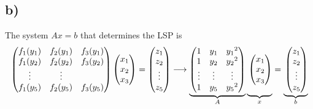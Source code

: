 \documentclass[12pt]{article}
\theoremstyle{definition}
\theoremstyle{definition}
\theoremstyle{definition}
\theoremstyle{definition}
\theoremstyle{definition}
\theoremstyle{example}
\theoremstyle{note}
\theoremstyle{remark}
\theoremstyle{example}
\begin{document}
			\subsection*{b) }	
				The system $Ax = b$ that determines the LSP is
				$$\begin{pmatrix}
				f_{1} (y_{1})  &f_{2} (y_{1})  & f_{3} (y_{1}) \\
				f_{1} (y_{2})  &f_{2} (y_{2}) & f_{3} (y_{2}) \\
				\vdots & \vdots \\
				f_{1} (y_{5})  &f_{2} (y_{5})  & f_{3} (y_{5})
				\end{pmatrix}
				\begin{pmatrix}
				x_{1} \\ x_{2} \\x_{3}
				\end{pmatrix}
				=\begin{pmatrix}
				z_{1} \\ z_{2}\\ \vdots\\ z_{5}
				\end{pmatrix}
				\longrightarrow
				\underbrace{\begin{pmatrix}
						1 & y_{1} & {y_{1}}^{2} \\
						1 & y_{2} & {y_{2}}^{2} \\
						\vdots & \vdots  & \vdots \\
						1 & y_{5} & {y_{5}}^{2}
					\end{pmatrix}}_{A}
				\underbrace{\vphantom{\begin{pmatrix}
						1 & y_{1} & {y_{1}}^{2} \\
						1 & y_{2} & {y_{2}}^{2} \\
						\vdots & \vdots  & \vdots \\
						1 & y_{5} & {y_{5}}^{2}
						\end{pmatrix}}\begin{pmatrix}
						x_{1} \\ x_{2} \\ x_{3} 
				\end{pmatrix}}_{x} =
			\underbrace{\vphantom{\begin{pmatrix}
					1 & y_{1} & {y_{1}}^{2} \\
					1 & y_{2} & {y_{2}}^{2} \\
					\vdots & \vdots  & \vdots \\
					1 & y_{5} & {y_{5}}^{2}
					\end{pmatrix}} \begin{pmatrix}
					z_{1} \\ z_{2} \\ \vdots \\ z_{5}
			\end{pmatrix}}_{b}$$
\end{document}
